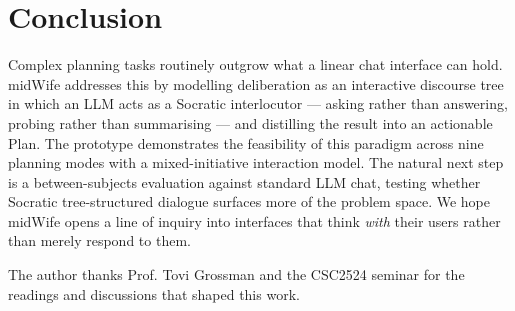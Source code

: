 \documentclass[sigconf]{acmart}
\begin{document}
\section{Conclusion}
Complex planning tasks routinely outgrow what a linear chat interface can hold.
midWife addresses this by modelling deliberation as an interactive discourse tree
in which an LLM acts as a Socratic interlocutor --- asking rather than answering,
probing rather than summarising --- and distilling the result into an actionable Plan.
The prototype demonstrates the feasibility of this paradigm across nine planning modes
with a mixed-initiative interaction model. The natural next step is a between-subjects
evaluation against standard LLM chat, testing whether Socratic tree-structured
dialogue surfaces more of the problem space. We hope midWife opens a line of inquiry
into interfaces that think \textit{with} their users rather than merely respond to them.


\begin{acks}
The author thanks Prof. Tovi Grossman and the CSC2524 seminar for the readings
and discussions that shaped this work.
\end{acks}



\end{document}
